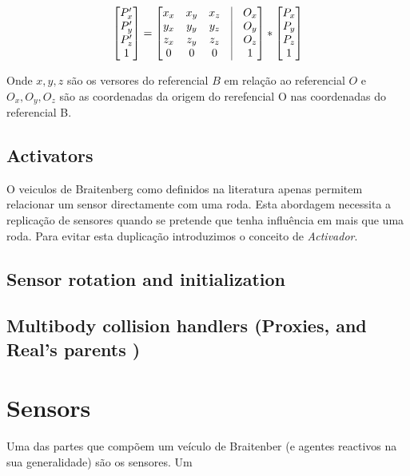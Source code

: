 \documentclass[a4paper]{article}
\begin{document}
\[
 	\begin{bmatrix}
		P_{x}' \\
		P_{y}' \\
		P_{z}' \\
		1 
	\end{bmatrix}
	=
	\begin{bmatrix}
		x_{x} & x_{y} & x_{z} & \vline & O_{x}	\\
		y_{x} & y_{y} & y_{z} & \vline & O_{y}	\\
		z_{x} & z_{y} & z_{z} & \vline & O_{z}	\\
		0 & 0 & 0 & \vline & 1 	\\
	\end{bmatrix}
	*
 	\begin{bmatrix}
		P_{x} \\
		P_{y} \\
		P_{z} \\
		1 
	\end{bmatrix}
\]

Onde $x, y, z$ são os versores do referencial $B$ em relação ao referencial $O$ e $O_{x}, O_{y}, O_{z}$ são as coordenadas da origem do rerefencial O nas coordenadas do referencial B. 

\cleardoublepage
\subsection{Activators}
\indent \indent O veiculos de Braitenberg como definidos na literatura apenas permitem relacionar um sensor directamente com uma roda.
Esta abordagem necessita a replicação de sensores quando se pretende que tenha influência em mais que uma roda.
Para evitar esta duplicação introduzimos o conceito de \emph{Activador}. 


\subsection{Sensor rotation and initialization}
\indent \indent 

\subsection{Multibody collision handlers (Proxies, and Real's parents )}
\indent \indent

\cleardoublepage
\section{Sensors}
Uma das partes que compõem um veículo de Braitenber (e agentes reactivos na sua generalidade) são os sensores.
Um
\end{document}

